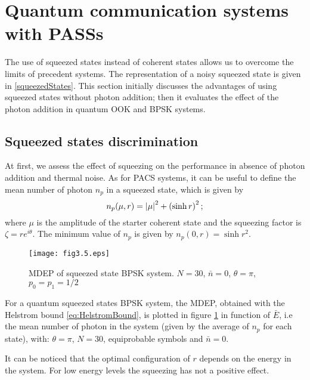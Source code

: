 \section{Quantum communication systems with PASSs}
    The use of squeezed states instead of coherent states allows us to overcome the limits
    of precedent systems. The representation of a noisy squeezed state is given in 
    \ref{squeezedStates}. This section initially discusses the advantages of using squeezed states 
    without photon addition; then it evaluates the effect of the photon addition
    in quantum OOK and BPSK systems.

    \subsection{Squeezed states discrimination}
        At first, we assess the effect of squeezing on the performance in absence of photon 
        addition and thermal noise. As for PACS systems, it can be useful to define the mean 
        number of photon $n_p$ in a squeezed state, which is given by
        \begin{equation}
            n_p(\mu,r) = \absolutevalue{\mu}^2 + \left(\sinh{r}\right)^2;
        \end{equation}
        where $\mu$ is the amplitude of the starter coherent state and the squeezing factor
        is $\zeta = r e^{i\theta}$. The minimum value of $n_p$ is given by $n_p(0,r) = \sinh{r}^2$.

        \begin{figure}[tbp]
            \begin{center}
                \texttt{[image: fig3.5.eps]}
                \caption{MDEP of squeezed state BPSK system. 
                    $N=30$, $\bar{n}=0$, $\theta=\pi$, $p_0=p_1=1/2$}
                \label{fig:3.5}
            \end{center}     
        \end{figure}
        For a quantum squeezed states BPSK system, the MDEP, obtained with the Helstrom bound 
        \ref{eq:HelstromBound}, is plotted in figure \ref{fig:3.5} in function of $\bar{E}$,
        i.e the mean number of photon in the system (given by the average of $n_p$ for each state), with:
        $\theta=\pi$, $N=30$, equiprobable symbols and $\bar{n}=0$.

        It can be noticed that the optimal configuration of $r$ depends on the energy in the 
        system. For low energy levels the squeezing has not a positive effect.

